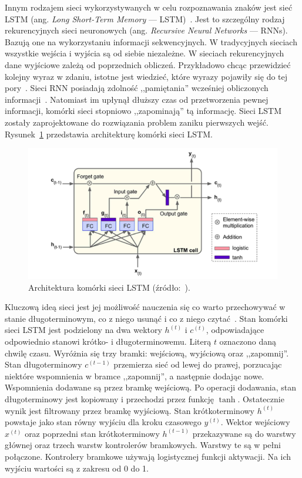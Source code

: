 Innym rodzajem sieci wykorzystywanych w celu rozpoznawania znaków jest sieć LSTM (ang. \textit{Long Short-Term Memory} --- LSTM)~\cite{6795963}.
Jest to szczególny rodzaj rekurencyjnych sieci neuronowych (ang. \textit{Recursive Neural Networks} --- RNNs).
Bazują one na wykorzystaniu informacji sekwencyjnych.
W tradycyjnych sieciach wszystkie wejścia i wyjścia są od siebie niezależne.
W sieciach rekurencyjnych dane wyjściowe zależą od poprzednich obliczeń.
Przykładowo chcąc przewidzieć kolejny wyraz w zdaniu, istotne jest wiedzieć, które wyrazy pojawiły się do tej pory~\cite{lawrynowicz_lstm}.
Sieci RNN posiadają zdolność ,,pamiętania'' wcześniej obliczonych informacji~\cite{lawrynowicz_lstm}.
Natomiast im upłynął dłuższy czas od przetworzenia pewnej informacji, komórki sieci stopniowo ,,zapominają'' tą informację.
Sieci LSTM zostały zaprojektowane do rozwiązania problem zaniku pierwszych wejść.
Rysunek~\ref{fig:lstm} przedstawia architekturę komórki sieci LSTM\@.
\begin{figure}[!ht]
    \centering
    \includegraphics[scale=0.6]{Pictures/lstm}
    \caption{Architektura komórki sieci LSTM (źródło:~\cite{10.5555/3153997}).}
    \label{fig:lstm}
\end{figure}
\FloatBarrier
Kluczową ideą sieci jest jej możliwość nauczenia się co warto przechowywać w stanie długoterminowym, co z niego usunąć i co z niego czytać~\cite{lawrynowicz_lstm}.
Stan komórki sieci LSTM jest podzielony na dwa wektory $h^{(t)}$ i $c^{(t)}$, odpowiadające odpowiednio stanowi krótko- i długoterminowemu.
Literą $t$ oznaczono daną chwilę czasu.
Wyróżnia się trzy bramki: wejściową, wyjściową oraz ,,zapomnij''.
Stan długoterminowy $c^{(t-1)}$ przemierza sieć od lewej do prawej, porzucając niektóre wspomnienia w bramce ,,zapomnij'', a następnie dodając nowe.
Wspomnienia dodawane są przez bramkę wejściową.
Po operacji dodawania, stan długoterminowy jest kopiowany i przechodzi przez funkcję $\tanh$.
Ostatecznie wynik jest filtrowany przez bramkę wyjściową.
Stan krótkoterminowy $h^{(t)}$ powstaje jako stan równy wyjściu dla kroku czasowego $y^{(t)}$.
Wektor wejściowy $x^{(t)}$ oraz poprzedni stan krótkoterminowy $h^{(t-1)}$ przekazywane są do warstwy głównej oraz trzech warstw kontrolerów bramkowych.
Warstwy te są w pełni połączone.
Kontrolery bramkowe używają logistycznej funkcji aktywacji.
Na ich wyjściu wartości są z zakresu od 0 do 1.

